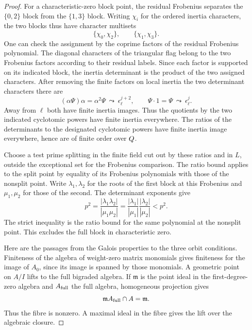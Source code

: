 \begin{proof}
For a characteristic-zero block point, the residual Frobenius
separates the \(\{0,2\}\) block from the \(\{1,3\}\) block.
Writing \(\chi_i\) for the ordered inertia characters, the two blocks thus have character multisets
\[
 \{\chi_0,\chi_2\},\qquad\{\chi_1,\chi_3\}.
\]
One can check the
assignment by the coprime factors of the residual Frobenius
polynomial. The diagonal characters of the triangular flag
belong to the two Frobenius factors according to their residual
labels. Since each factor is supported on its indicated block,
the inertia determinant is the product of the two assigned
characters. After removing the finite factors on local inertia the
two determinant characters there are
\[
    (\alpha\Psi)\alpha=\alpha^2\Psi\ \leadsto\ \epsilon_\ell^{j+2},
     \qquad \Psi\cdot1=\Psi\ \leadsto\ \epsilon_\ell^j .
\]
Away from \(\ell\) both have finite inertia images. Thus the
quotients by the two indicated cyclotomic powers have finite
inertia everywhere. The ratios of the determinants
to the designated cyclotomic powers have finite inertia image
everywhere, hence are of finite order over \(Q\).

Choose a test prime splitting in the finite field cut out by
these ratios and in \(L\), outside the exceptional set for
the Frobenius comparison. The ratio bound applies to the
split point by equality of its Frobenius polynomials with those
of the nonsplit point.
Write \(\lambda_1,\lambda_2\) for the roots of the first
block at this Frobenius and \(\mu_1,\mu_2\) for those of the
second. The determinant exponents give
\[
       p^2=\frac{|\lambda_1\lambda_2|}{|\mu_1\mu_2|}
           =\frac{|\lambda_1|}{|\mu_1|}
              \frac{|\lambda_2|}{|\mu_2|}<p^2.
\]
The strict inequality is the ratio bound for the same polynomial
at the nonsplit point. This excludes the full block in
characteristic zero. \label{cor:ordinary-symplectic-cohomology-11}

Here are the passages from the Galois properties to the
three orbit conditions. Finiteness of the algebra of
weight-zero matrix monomials gives finiteness for the
image of \(A_0\), since its image is spanned by those
monomials. A geometric point on \(A/I\) lifts to the full
bigraded algebra. If \(\mathfrak m\) is the point ideal in the first-degree-zero
algebra and \(A_{\rm full}\) the full algebra, homogeneous projection gives
\[
              \mathfrak m A_{\rm full}\cap A =\mathfrak m .
\]
Thus the fibre is nonzero. A maximal ideal in the fibre gives
the lift over the algebraic closure.


\end{proof}
